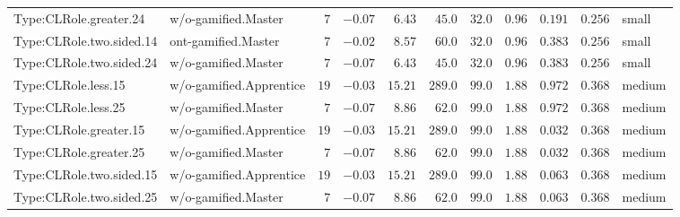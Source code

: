 \documentclass[6pt,a4paper]{article}
\begin{document}
{\begin{longtable}{llrrrrrrrrl}
Type:CLRole.greater.24&w/o-gamified.Master&$ 7$&$-0.07$&$ 6.43$&$ 45.0$&$ 32.0$&$ 0.96$&$0.191$&$0.256$&small\tabularnewline
Type:CLRole.two.sided.14&ont-gamified.Master&$ 7$&$-0.02$&$ 8.57$&$ 60.0$&$ 32.0$&$ 0.96$&$0.383$&$0.256$&small\tabularnewline
Type:CLRole.two.sided.24&w/o-gamified.Master&$ 7$&$-0.07$&$ 6.43$&$ 45.0$&$ 32.0$&$ 0.96$&$0.383$&$0.256$&small\tabularnewline
Type:CLRole.less.15&w/o-gamified.Apprentice&$19$&$-0.03$&$15.21$&$289.0$&$ 99.0$&$ 1.88$&$0.972$&$0.368$&medium\tabularnewline
Type:CLRole.less.25&w/o-gamified.Master&$ 7$&$-0.07$&$ 8.86$&$ 62.0$&$ 99.0$&$ 1.88$&$0.972$&$0.368$&medium\tabularnewline
Type:CLRole.greater.15&w/o-gamified.Apprentice&$19$&$-0.03$&$15.21$&$289.0$&$ 99.0$&$ 1.88$&$0.032$&$0.368$&medium\tabularnewline
Type:CLRole.greater.25&w/o-gamified.Master&$ 7$&$-0.07$&$ 8.86$&$ 62.0$&$ 99.0$&$ 1.88$&$0.032$&$0.368$&medium\tabularnewline
\newpage
Type:CLRole.two.sided.15&w/o-gamified.Apprentice&$19$&$-0.03$&$15.21$&$289.0$&$ 99.0$&$ 1.88$&$0.063$&$0.368$&medium\tabularnewline
Type:CLRole.two.sided.25&w/o-gamified.Master&$ 7$&$-0.07$&$ 8.86$&$ 62.0$&$ 99.0$&$ 1.88$&$0.063$&$0.368$&medium\tabularnewline
\hline
\end{longtable}}
\end{document}

